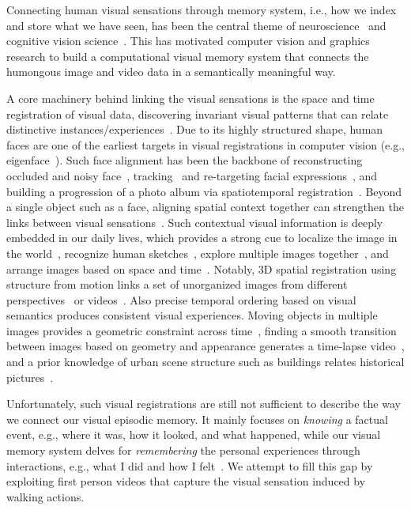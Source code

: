 \documentclass[10pt,twocolumn,letterpaper]{article}
\begin{document}
Connecting human visual sensations through memory system, i.e., how we index and store what we have seen, has been the central theme of neuroscience~\cite{ungerleider:1998,vogel:2004} and cognitive vision science~\cite{melcher:2001,reinhart:2015,brady:2011}. This has motivated computer vision and graphics research to build a computational visual memory system that connects the humongous image and video data in a semantically meaningful way. 


A core machinery behind linking the visual sensations is the space and time registration of visual data, discovering invariant visual patterns that can relate distinctive instances/experiences~\cite{gibson:1979}. Due to its highly structured shape, human faces are one of the earliest targets in visual registrations in computer vision (e.g., eigenface~\cite{turk:1991}). Such face alignment has been the backbone of reconstructing occluded and noisy face~\cite{wright:2011}, tracking~\cite{saragih:2011} and re-targeting facial expressions~\cite{shlizerman:2010}, and building a progression of a photo album via spatiotemporal registration~\cite{shlizerman:2011}. Beyond a single object such as a face, aligning spatial context together can strengthen the links between visual sensations~\cite{oliva:2007,malisiewicz:2009}. Such contextual visual information is deeply embedded in our daily lives, which provides a strong cue to localize the image in the world~\cite{shrivastava:2011,doersch:2012}, recognize human sketches~\cite{lee:2011}, explore multiple images together~\cite{zhu:2014}, and arrange images based on space and time~\cite{lee:2013}. Notably, 3D spatial registration using structure from motion links a set of unorganized images from different perspectives~\cite{snavely:2006, snavely:2008} or videos~\cite{tompkin:2012, arev:2014}. Also precise temporal ordering based on visual semantics produces consistent visual experiences. Moving objects in multiple images provides a geometric constraint across time~\cite{PhotoSeq_ECCV12}, finding a smooth transition between images based on geometry and appearance generates a time-lapse video~\cite{brualla:2015}, and a prior knowledge of urban scene structure such as buildings relates historical pictures~\cite{schindler:2010}.  


Unfortunately, such visual registrations are still not sufficient to describe the way we connect our visual episodic memory. It mainly focuses on {\em knowing} a factual event, e.g., where it was, how it looked, and what happened, while our visual memory system delves for {\em remembering} the personal experiences through interactions, e.g., what I did and how I felt~\cite{tulving:1983}. We attempt to fill this gap by exploiting first person videos that capture the visual sensation induced by walking actions.
\end{document}

